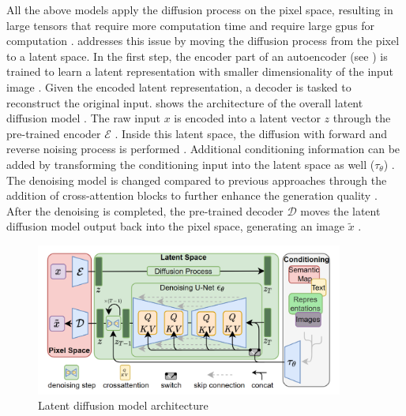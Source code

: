 All the above models apply the diffusion process on the pixel space, resulting in large tensors that require more computation time and require large \glspl{gpu} for computation \cite{rombach2022HighResolutionImageSynthesis}.
\textcite{rombach2022HighResolutionImageSynthesis} addresses this issue by moving the diffusion process from the pixel to a latent space.
In the first step, the encoder part of an autoencoder (see ) is trained to learn a latent representation with smaller dimensionality of the input image \cite{rombach2022HighResolutionImageSynthesis}.
Given the encoded latent representation, a decoder is tasked to reconstruct the original input.
 shows the architecture of the overall latent diffusion \gls{model} \cite[Figure 3, p.4]{rombach2022HighResolutionImageSynthesis}.
The raw input $x$ is encoded into a latent vector $z$ through the pre-trained encoder $\mathcal{E}$ \cite{rombach2022HighResolutionImageSynthesis}.
Inside this latent space, the diffusion with forward and reverse noising process is performed \cite{rombach2022HighResolutionImageSynthesis}.
Additional conditioning information can be added by transforming the conditioning input into the latent space as well ($\tau_\theta$) \cite{rombach2022HighResolutionImageSynthesis}.
The denoising \gls{model} is changed compared to previous approaches through the addition of cross-attention blocks to further enhance the generation quality \cite{rombach2022HighResolutionImageSynthesis}.
After the denoising is completed, the pre-trained decoder $\mathcal{D}$ moves the latent diffusion \gls{model} output back into the pixel space, generating an image $\tilde{x}$ \cite{rombach2022HighResolutionImageSynthesis}.

\begin{figure}[h]
    \centering
    \includegraphics[width=0.9\textwidth]{images/latent-diff.png}
    \caption[Latent Diffusion Model]{Latent diffusion model architecture \cite[Figure 3, p.4]{rombach2022HighResolutionImageSynthesis}}
    \label{fig:latent-diff}
\end{figure}

